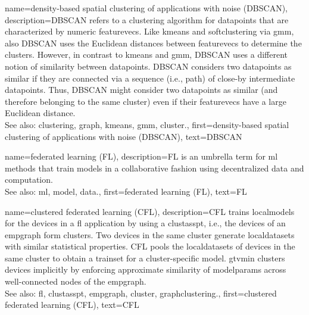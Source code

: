 {name={density-based spatial clustering of applications with noise (DBSCAN)}, 
	description={DBSCAN refers to a \gls{clustering} \gls{algorithm} for \glspl{datapoint} 
			that are characterized by numeric \glspl{featurevec}. 
		Like \gls{kmeans} and \gls{softclustering} via \gls{gmm}, also DBSCAN uses the Euclidean 
		distances between \glspl{featurevec} to determine the \glspl{cluster}. However, in contrast to \gls{kmeans} 
		and \gls{gmm}, DBSCAN uses a different notion of similarity between \glspl{datapoint}. 
		DBSCAN considers two \glspl{datapoint} as similar if they are connected 
		via a sequence (i.e., path) of close-by intermediate \glspl{datapoint}. 
		Thus, DBSCAN might consider two \glspl{datapoint} as similar (and therefore belonging 
		to the same \gls{cluster}) even if their \glspl{featurevec} have a large Euclidean distance.
				\\
		See also: \gls{clustering}, \gls{graph}, \gls{kmeans}, \gls{gmm}, \gls{cluster}.},
	first={density-based spatial clustering of applications with noise (DBSCAN)},
	text={DBSCAN} 
}

{name={federated learning (FL)}, 
	description={FL 
		is an umbrella term for \gls{ml} methods that train \glspl{model} in a collaborative 
		fashion using decentralized \gls{data} and computation.
				\\
		See also: \gls{ml}, \gls{model}, \gls{data}.},
	first={federated learning (FL)},
	text={FL} 
}
	
{name={clustered federated learning (CFL)}, 
 description={CFL trains \glspl{localmodel} for the 
 	\glspl{device} in a \gls{fl} application by using a \gls{clustasspt}, i.e., the \glspl{device} 
 	of an \gls{empgraph} form \glspl{cluster}. Two \glspl{device} in the same \gls{cluster} generate 
 	\glspl{localdataset} with similar statistical properties. CFL pools the \glspl{localdataset} of \glspl{device} 
 	in the same \gls{cluster} to obtain a \gls{trainset} for a \gls{cluster}-specific \gls{model}. 
 	\Gls{gtvmin} clusters \glspl{device} implicitly by enforcing approximate similarity of \gls{modelparams} 
 	across well-connected nodes of the \gls{empgraph}.\\ 
 	See also: \gls{fl}, \gls{clustasspt}, \gls{empgraph}, \gls{cluster}, \gls{graphclustering}.},
	first={clustered federated learning (CFL)},
	text={CFL} 
}

